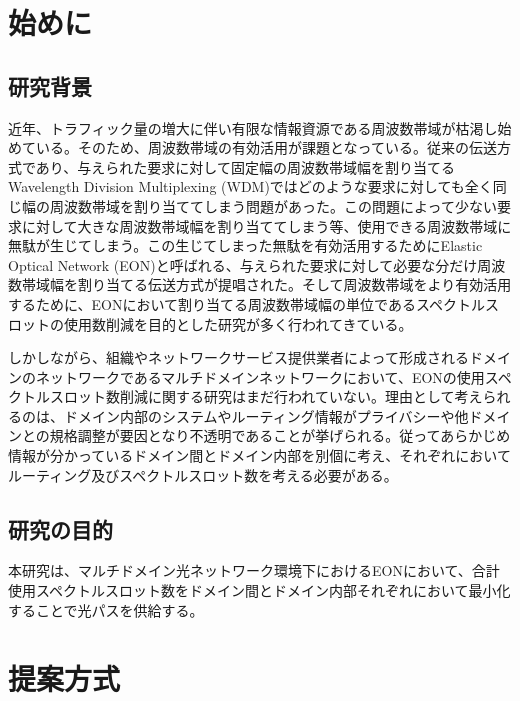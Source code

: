 \documentclass[a4j,twocolumn,fleqn]{jarticle}
\begin{document}
 
\Title
\section{始めに}
\subsection{研究背景}
近年、トラフィック量の増大に伴い有限な情報資源である周波数帯域が枯渇し始めている。そのため、周波数帯域の有効活用が課題となっている。従来の伝送方式であり、与えられた要求に対して固定幅の周波数帯域幅を割り当てるWavelength Division Multiplexing (WDM)ではどのような要求に対しても全く同じ幅の周波数帯域を割り当ててしまう問題があった。この問題によって少ない要求に対して大きな周波数帯域幅を割り当ててしまう等、使用できる周波数帯域に無駄が生じてしまう。この生じてしまった無駄を有効活用するためにElastic Optical Network (EON)と呼ばれる、与えられた要求に対して必要な分だけ周波数帯域幅を割り当てる伝送方式が提唱された。そして周波数帯域をより有効活用するために、EONにおいて割り当てる周波数帯域幅の単位であるスペクトルスロットの使用数削減を目的とした研究が多く行われてきている。

しかしながら、組織やネットワークサービス提供業者によって形成されるドメインのネットワークであるマルチドメインネットワークにおいて、EONの使用スペクトルスロット数削減に関する研究はまだ行われていない。理由として考えられるのは、ドメイン内部のシステムやルーティング情報がプライバシーや他ドメインとの規格調整が要因となり不透明であることが挙げられる。従ってあらかじめ情報が分かっているドメイン間とドメイン内部を別個に考え、それぞれにおいてルーティング及びスペクトルスロット数を考える必要がある。
\subsection{研究の目的}
本研究は、マルチドメイン光ネットワーク環境下におけるEONにおいて、合計使用スペクトルスロット数をドメイン間とドメイン内部それぞれにおいて最小化することで光パスを供給する。
\section{提案方式}
%
\end{document}
